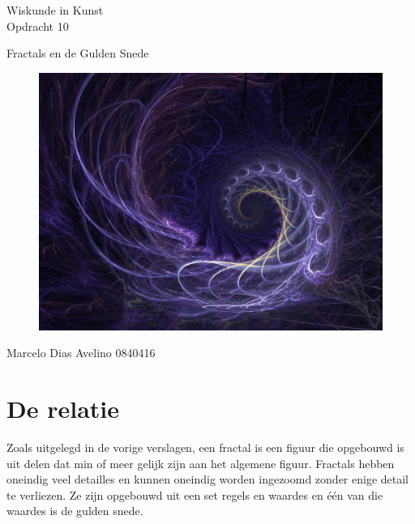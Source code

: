 \documentclass{article}
\begin{document}
\begin{center}
	\huge{Wiskunde in Kunst}\\
	\LARGE{Opdracht 10} \\
	
	\vspace{2cm}
	
	\Large{Fractals en de Gulden Snede}\\
	
	\vfill
	
	\begin{figure}[Hh]
		\centering
		\includegraphics[width=\textwidth]{Golden_Ratio.jpg}
	\end{figure}
	
	\vfill
	\Large{Marcelo Dias Avelino} \hfill \large{0840416}
\end{center}

\thispagestyle{empty} %

\pagebreak

\setcounter{page}{1} %

\section{De relatie}

Zoals uitgelegd in de vorige verslagen, een fractal is een figuur die opgebouwd is uit delen dat min of meer gelijk zijn aan het algemene figuur. Fractals hebben oneindig veel detailles en kunnen oneindig worden ingezoomd zonder enige detail te verliezen. Ze zijn opgebouwd uit een set regels en waardes en \'e\'en van die waardes is de gulden snede.

\end{document}
